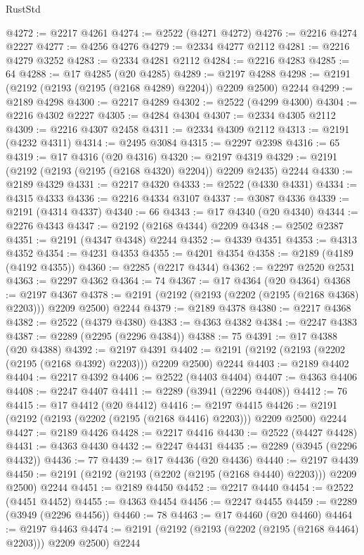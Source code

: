 \begin{lexlean}{RustStd}
\begin{coremodule}
@4272 := @2217 @4261
@4274 := @2522 (@4271 @4272)
@4276 := @2216 @4274 @2227
@4277 := @4256 @4276
@4279 := @2334 @4277 @2112
@4281 := @2216 @4279 @3252
@4283 := @2334 @4281 @2112
@4284 := @2216 @4283
@4285 := 64
@4288 := @17 @4285 (@20 @4285)
@4289 := @2197 @4288
@4298 := @2191 (@2192 (@2193 (@2195 (@2168 @4289) @2204)) @2209 @2500) @2244
@4299 := @2189 @4298
@4300 := @2217 @4289
@4302 := @2522 (@4299 @4300)
@4304 := @2216 @4302 @2227
@4305 := @4284 @4304
@4307 := @2334 @4305 @2112
@4309 := @2216 @4307 @2458
@4311 := @2334 @4309 @2112
@4313 := @2191 (@4232 @4311)
@4314 := @2495 @3084
@4315 := @2297 @2398
@4316 := 65
@4319 := @17 @4316 (@20 @4316)
@4320 := @2197 @4319
@4329 := @2191 (@2192 (@2193 (@2195 (@2168 @4320) @2204)) @2209 @2435) @2244
@4330 := @2189 @4329
@4331 := @2217 @4320
@4333 := @2522 (@4330 @4331)
@4334 := @4315 @4333
@4336 := @2216 @4334 @3107
@4337 := @3087 @4336
@4339 := @2191 (@4314 @4337)
@4340 := 66
@4343 := @17 @4340 (@20 @4340)
@4344 := @2276 @4343
@4347 := @2192 (@2168 @4344) @2209
@4348 := @2502 @2387
@4351 := @2191 (@4347 @4348) @2244
@4352 := @4339 @4351
@4353 := @4313 @4352
@4354 := @4231 @4353
@4355 := @4201 @4354
@4358 := @2189 (@4189 (@4192 @4355))
@4360 := @2285 (@2217 @4344)
@4362 := @2297 @2520 @2531
@4363 := @2297 @4362
@4364 := 74
@4367 := @17 @4364 (@20 @4364)
@4368 := @2197 @4367
@4378 := @2191 (@2192 (@2193 (@2202 (@2195 (@2168 @4368) @2203))) @2209 @2500) @2244
@4379 := @2189 @4378
@4380 := @2217 @4368
@4382 := @2522 (@4379 @4380)
@4383 := @4363 @4382
@4384 := @2247 @4383
@4387 := @2289 (@2295 (@2296 @4384))
@4388 := 75
@4391 := @17 @4388 (@20 @4388)
@4392 := @2197 @4391
@4402 := @2191 (@2192 (@2193 (@2202 (@2195 (@2168 @4392) @2203))) @2209 @2500) @2244
@4403 := @2189 @4402
@4404 := @2217 @4392
@4406 := @2522 (@4403 @4404)
@4407 := @4363 @4406
@4408 := @2247 @4407
@4411 := @2289 (@3941 (@2296 @4408))
@4412 := 76
@4415 := @17 @4412 (@20 @4412)
@4416 := @2197 @4415
@4426 := @2191 (@2192 (@2193 (@2202 (@2195 (@2168 @4416) @2203))) @2209 @2500) @2244
@4427 := @2189 @4426
@4428 := @2217 @4416
@4430 := @2522 (@4427 @4428)
@4431 := @4363 @4430
@4432 := @2247 @4431
@4435 := @2289 (@3945 (@2296 @4432))
@4436 := 77
@4439 := @17 @4436 (@20 @4436)
@4440 := @2197 @4439
@4450 := @2191 (@2192 (@2193 (@2202 (@2195 (@2168 @4440) @2203))) @2209 @2500) @2244
@4451 := @2189 @4450
@4452 := @2217 @4440
@4454 := @2522 (@4451 @4452)
@4455 := @4363 @4454
@4456 := @2247 @4455
@4459 := @2289 (@3949 (@2296 @4456))
@4460 := 78
@4463 := @17 @4460 (@20 @4460)
@4464 := @2197 @4463
@4474 := @2191 (@2192 (@2193 (@2202 (@2195 (@2168 @4464) @2203))) @2209 @2500) @2244

\end{coremodule}
\end{lexlean}
